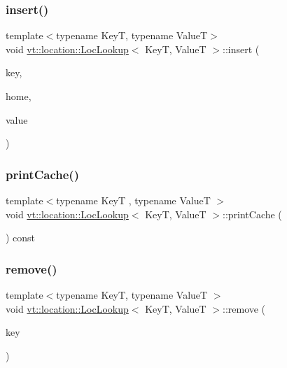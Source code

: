 \mbox{\label{structvt_1_1location_1_1_loc_lookup_a63ff201b384e4f65c02b3a99b8ba543e}} 
\subsubsection{\texorpdfstring{insert()}{insert()}}
{\footnotesize\ttfamily template$<$typename KeyT, typename ValueT$>$ \\
void \hyperlink{structvt_1_1location_1_1_loc_lookup}{vt\+::location\+::\+Loc\+Lookup}$<$ KeyT, ValueT $>$\+::insert (\begin{DoxyParamCaption}\item[{KeyT const \&}]{key,  }\item[{\hyperlink{namespacevt_a866da9d0efc19c0a1ce79e9e492f47e2}{Node\+Type} const}]{home,  }\item[{ValueT const \&}]{value }\end{DoxyParamCaption})}

\mbox{\label{structvt_1_1location_1_1_loc_lookup_a03bf48e7c5af3720c13e00ead13c83a0}} 
\subsubsection{\texorpdfstring{print\+Cache()}{printCache()}}
{\footnotesize\ttfamily template$<$typename KeyT , typename ValueT $>$ \\
void \hyperlink{structvt_1_1location_1_1_loc_lookup}{vt\+::location\+::\+Loc\+Lookup}$<$ KeyT, ValueT $>$\+::print\+Cache (\begin{DoxyParamCaption}{ }\end{DoxyParamCaption}) const}

\mbox{\label{structvt_1_1location_1_1_loc_lookup_a6c82de648f51e3242bd7430d185041fe}} 
\subsubsection{\texorpdfstring{remove()}{remove()}}
{\footnotesize\ttfamily template$<$typename KeyT, typename ValueT $>$ \\
void \hyperlink{structvt_1_1location_1_1_loc_lookup}{vt\+::location\+::\+Loc\+Lookup}$<$ KeyT, ValueT $>$\+::remove (\begin{DoxyParamCaption}\item[{KeyT const \&}]{key }\end{DoxyParamCaption})}

